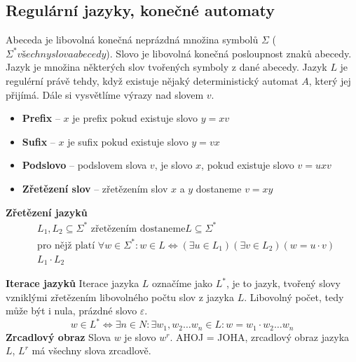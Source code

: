 \subsection{Regulární jazyky, konečné automaty}
Abeceda je libovolná konečná neprázdná množina symbolů $\Sigma$ ($\Sigma^* všechny slova abecedy$).  Slovo je libovolná konečná posloupnost znaků abecedy. Jazyk je množina některých slov tvořených symboly z dané abecedy. Jazyk $L$ je regulérní právě tehdy, když existuje nějaký deterministický automat $A$, který jej přijímá. Dále si vysvětlíme výrazy nad slovem $v$.
\begin{itemize}
\item \textbf{Prefix} -- $x$ je prefix pokud existuje slovo $y = xv$
\item \textbf{Sufix} -- $x$ je sufix pokud existuje slovo $y = vx$
\item \textbf{Podslovo} -- podslovem slova $v$, je slovo $x$, pokud existuje slovo $v = uxv$
\item \textbf{Zřetězení slov} -- zřetězením slov $x$ a $y$ dostaneme $v = xy$
\end{itemize}

\textbf{Zřetězení jazyků} 
\begin{equation}
\begin{aligned}
	&L_1, L_2 \subseteq \Sigma^* \text{ zřetězením dostaneme} L \subseteq \Sigma^* \\
	&\text{pro nějž platí } \forall w \in \Sigma^*: w\in L \iff (\exists u \in L_1)(\exists v \in L_2)(w = u \cdot v) \\
	&L_1 \cdot L_2
\end{aligned}
\end{equation}

\textbf{Iterace jazyků}
Iterace jazyka $L$ označíme jako $L^*$, je to jazyk, tvořený slovy vzniklými zřetězením libovolného počtu slov z jazyka $L$. Libovolný počet, tedy může být i nula, prázdné slovo $\varepsilon$.
\begin{equation}
w \in L^* \iff \exists n \in N: \exists w_1,w_2\ldots w_n \in L : w = w_1 \cdot w_2 \ldots w_n
\end{equation}
\textbf{Zrcadlový obraz}
Slova $w$ je slovo $w^r$. AHOJ = JOHA, zrcadlový obraz jazyka $L$, $L^r$ má všechny slova zrcadlově.
